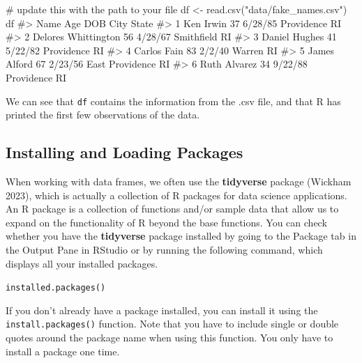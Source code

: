 \documentclass[
  letterpaper,
]{latex/krantz}
\makeatletter
\newenvironment{Shaded}{\begin{snugshade}}{\end{snugshade}}
\newcommand{\CommentTok}[1]{\textcolor[rgb]{0.37,0.37,0.37}{#1}}
\newcommand{\FunctionTok}[1]{\textcolor[rgb]{0.28,0.35,0.67}{#1}}
\newcommand{\NormalTok}[1]{\textcolor[rgb]{0.00,0.23,0.31}{#1}}
\newcommand{\OtherTok}[1]{\textcolor[rgb]{0.00,0.23,0.31}{#1}}
\newcommand{\StringTok}[1]{\textcolor[rgb]{0.13,0.47,0.30}{#1}}
\newenvironment{kframe}{%
\medskip{}
\setlength{\fboxsep}{.8em}
 \def\at@end@of@kframe{}%
 \ifinner\ifhmode%
  \def\at@end@of@kframe{\end{minipage}}%
  \begin{minipage}{\columnwidth}%
 \fi\fi%
 \def\FrameCommand##1{\hskip\@totalleftmargin \hskip-\fboxsep
 \colorbox{shadecolor}{##1}\hskip-\fboxsep
     \hskip-\linewidth \hskip-\@totalleftmargin \hskip\columnwidth}%
 \MakeFramed {\advance\hsize-\width
   \@totalleftmargin\z@ \linewidth\hsize
   \@setminipage}}%
 {\par\unskip\endMakeFramed%
 \at@end@of@kframe}
\renewenvironment{Shaded}{\begin{kframe}}{\end{kframe}}
\makeatother
\begin{document}
\begin{Shaded}
\begin{Highlighting}[]
\CommentTok{\# update this with the path to your file}
\NormalTok{df }\OtherTok{\textless{}{-}} \FunctionTok{read.csv}\NormalTok{(}\StringTok{"data/fake\_names.csv"}\NormalTok{) }
\NormalTok{df}
\CommentTok{\#\textgreater{}                  Name Age     DOB            City State}
\CommentTok{\#\textgreater{} 1           Ken Irwin  37 6/28/85      Providence    RI}
\CommentTok{\#\textgreater{} 2 Delores Whittington  56 4/28/67      Smithfield    RI}
\CommentTok{\#\textgreater{} 3       Daniel Hughes  41 5/22/82      Providence    RI}
\CommentTok{\#\textgreater{} 4         Carlos Fain  83  2/2/40          Warren    RI}
\CommentTok{\#\textgreater{} 5        James Alford  67 2/23/56 East Providence    RI}
\CommentTok{\#\textgreater{} 6        Ruth Alvarez  34 9/22/88      Providence    RI}
\end{Highlighting}
\end{Shaded}

We can see that \texttt{df} contains the information from the .csv file,
and that R has printed the first few observations of the data.

\subsection{Installing and Loading
Packages}\label{installing-and-loading-packages}

When working with data frames, we often use the \textbf{tidyverse}
package (Wickham 2023), which is actually a
collection of R packages for data science applications. An R package
 is a collection of functions and/or sample data that
allow us to expand on the functionality of R beyond the base functions.
You can check whether you have the \textbf{tidyverse} package installed
by going to the Package tab in the Output Pane in RStudio or by running
the following command, which displays all your installed packages.

\texttt{installed.packages()}

If you don't already have a package installed, you can install it using
the \texttt{install.packages()}
function.
Note that you have to include single or double quotes around the package
name when using this function. You only have to install a package one
time.
\end{document}
